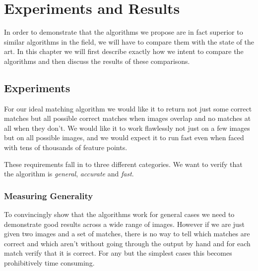 \chapter{Experiments and Results}
\label{C:Experiments}

In order to demonstrate that the algorithms we propose are in fact 
superior to similar algorithms in the field, we will have to compare 
them with the state of the art. In this chapter we will first describe 
exactly how we intent to compare the algorithms and then discuss the 
results of these comparisons.  

\section{Experiments}
For our ideal matching algorithm we would like it to return not just 
some correct matches but all possible correct matches when images 
overlap and no matches at all when they don't.  We would like it to work 
flawlessly not just on a few images but on all possible images, and we 
would expect it to run fast even when faced with tens of thousands of 
feature points.

These requirements fall in to three different categories. We want to 
verify that the algorithm is \emph{general}, \emph{accurate} and 
\emph{fast}.

\subsection{Measuring Generality}

To convincingly show that the algorithms work for general cases we need 
to demonstrate good results across a wide range of images.  However if 
we are just given two images and a set of matches, there is no
way to tell which matches are correct and which aren't without going 
through the output by hand and for each match verify that it is correct.  
For any but the simplest cases this becomes prohibitively time 
consuming.

